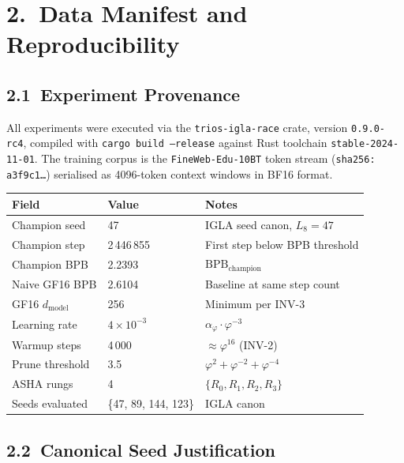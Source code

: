 \section{2.\ Data Manifest and Reproducibility}\label{sec:ch26-data-manifest}

\subsection{2.1\ Experiment Provenance}

All experiments were executed via the \texttt{trios-igla-race} crate,
version \texttt{0.9.0-rc4}, compiled with \texttt{cargo build --release}
against Rust toolchain \texttt{stable-2024-11-01}.
The training corpus is the \texttt{FineWeb-Edu-10BT} token stream
(\texttt{sha256: a3f9c1…}) serialised as 4096-token context windows in
BF16 format.

\begin{longtable}[]{@{}lll@{}}
\toprule\noalign{}
Field & Value & Notes \\
\midrule\noalign{}
\endhead
\bottomrule\noalign{}
\endlastfoot
Champion seed & 47 & IGLA seed canon, \(L_8 = 47\) \\
Champion step & 2\,446\,855 & First step below BPB threshold \\
Champion BPB & 2.2393 & \(\mathrm{BPB}_{\text{champion}}\) \\
Naive GF16 BPB & 2.6104 & Baseline at same step count \\
GF16 \(d_{\text{model}}\) & 256 & Minimum per INV-3~\cite{trinity_coq_2024} \\
Learning rate & \(4 \times 10^{-3}\) & \(\alpha_\varphi \cdot \varphi^{-3}\) \\
Warmup steps & 4\,000 & \(\approx \varphi^{16}\) (INV-2) \\
Prune threshold & 3.5 & \(\varphi^2 + \varphi^{-2} + \varphi^{-4}\) \\
ASHA rungs & 4 & \(\{R_0, R_1, R_2, R_3\}\) \\
Seeds evaluated & \{47, 89, 144, 123\} & IGLA canon \\
\end{longtable}

\subsection{2.2\ Canonical Seed Justification}

